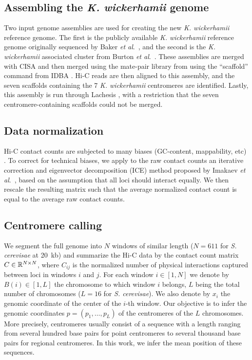 \subsection{Assembling the \textit{K. wickerhamii} genome}

Two input genome assemblies are used for creating the new \textit{K.
wickerhamii}
reference genome. The first is the publicly available \textit{K. wickerhamii} reference
genome originally sequenced by Baker \textit{et al}.~\cite{baker:extensive},
and the
second is the \textit{K. wickerhamii} associated cluster from
Burton \textit{et al}.~\cite{burton:species-level}. These assemblies are merged with CISA
\citep{lin:cisa} and then
merged using the mate-pair library from \citep{burton:species-level} using the
``scaffold'' command from IDBA \citep{peng:IDBA}. Hi-C reads are then aligned to
this assembly, and the seven scaffolds containing the 7 \textit{K. wickerhamii}
centromeres are identified. Lastly, this assembly is run through Lachesis
\citep{burton:chromosome}, with a restriction that the seven
centromere-containing scaffolds could not be merged.

\subsection{Data normalization}

Hi-C contact counts are subjected to many biases (GC-content, mappability,
etc) \cite{yaffe:probabilistic}. To correct for technical biases, we apply 
to the raw contact counts an iterative correction and eigenvector decomposition
(ICE) method proposed by Imakaev \textit{et al}.~\cite{imakaev:iterative},
based on the assumption
that all loci should interact equally. We then rescale the resulting matrix
such that the average normalized contact count is equal to the average raw
contact counts.

\subsection{Centromere calling}

We segment the full genome into $N$ windows of similar length ($N=611$ for
\textit{S. cerevisae} at 20~kb) and summarize the Hi-C data by the contact
count matrix $C\in\mathbb{R}^{N \times N}$, where $C_{ij}$ is the normalized number
of physical interactions captured between loci in windows $i$ and $j$. 
For each window $i\in[1,N]$
we denote by $B(i) \in [1,L]$ the chromosome to which window $i$ belongs,
$L$ being the total number of chromosomes ($L=16$
for \textit{S. cerevisae}). We also denote by $x_i$ the genomic coordinate of
the center of the $i$-th window. Our objective is to infer the genomic
coordinates $p=(p_1, \ldots, p_L)$ of the centromeres of the $L$ chromosomes.
More precisely, centromeres usually consist of a sequence with a length ranging from several hundred
base pairs
for point centromeres to several thousand base pairs for regional centromeres.
In this work, we infer the mean position of these sequences.

